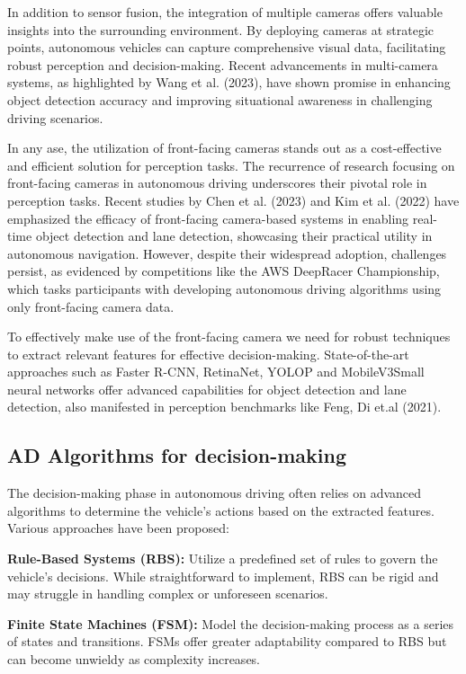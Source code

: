 \documentclass[conference]{IEEEtran}
\begin{document}
In addition to sensor fusion, the integration of multiple cameras offers valuable insights into the surrounding environment. By deploying cameras at strategic points, autonomous vehicles can capture comprehensive visual data, facilitating robust perception and decision-making. Recent advancements in multi-camera systems, as highlighted by Wang et al. (2023), have shown promise in enhancing object detection accuracy and improving situational awareness in challenging driving scenarios.

In any ase, the utilization of front-facing cameras stands out as a cost-effective and efficient solution for perception tasks. The recurrence of research focusing on front-facing cameras in autonomous driving underscores their pivotal role in perception tasks. Recent studies by Chen et al. (2023) and Kim et al. (2022) have emphasized the efficacy of front-facing camera-based systems in enabling real-time object detection and lane detection, showcasing their practical utility in autonomous navigation. However, despite their widespread adoption, challenges persist, as evidenced by competitions like the AWS DeepRacer Championship, which tasks participants with developing autonomous driving algorithms using only front-facing camera data. 

To effectively make use of the front-facing camera we need for robust techniques to extract relevant features for effective decision-making. State-of-the-art approaches such as Faster R-CNN, RetinaNet, YOLOP and MobileV3Small neural networks offer advanced capabilities for object detection and lane detection, also manifested in perception benchmarks like Feng, Di et.al (2021).

\subsection{AD Algorithms for decision-making}

The decision-making phase in autonomous driving often relies on advanced algorithms to determine the vehicle's actions based on the extracted features. Various approaches have been proposed:

\textbf{Rule-Based Systems (RBS):} Utilize a predefined set of rules to govern the vehicle’s decisions. While straightforward to implement, RBS can be rigid and may struggle in handling complex or unforeseen scenarios.

\textbf{Finite State Machines (FSM):} Model the decision-making process as a series of states and transitions. FSMs offer greater adaptability compared to RBS but can become unwieldy as complexity increases.
\end{document}
